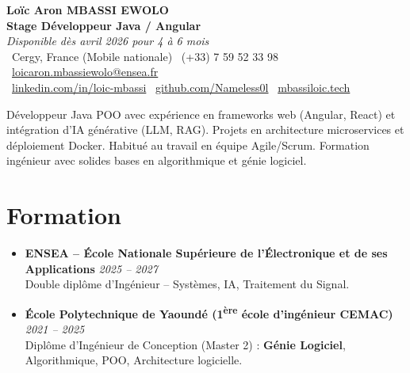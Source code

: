 \documentclass[a4paper,11pt]{article}
\begin{document}
\begin{center}
    {\Large \textbf{Loïc Aron MBASSI EWOLO}} \\ \vspace{4pt}
    \textbf{\large Stage Développeur Java / Angular} \\
    \textit{\small Disponible dès avril 2026 pour 4 à 6 mois} \\ \vspace{4pt}
    \small
    \faMapMarker\ Cergy, France (Mobile nationale) \quad
    \faPhone\ (+33) 7 59 52 33 98 \quad
    {\color{primary}\faEnvelope\ \href{mailto:loicaron.mbassiewolo@ensea.fr}{loicaron.mbassiewolo@ensea.fr}} \\ \vspace{2pt}
    {\color{primary}\faLinkedin\ \href{https://www.linkedin.com/in/loic-mbassi/}{linkedin.com/in/loic-mbassi}} \quad
    {\color{primary}\faGithub\ \href{https://github.com/Nameless0l}{github.com/Nameless0l}} \quad
    {\color{primary}\faGlobe\ \href{https://mbassiloic.tech}{mbassiloic.tech}}
\end{center}

\vspace{-6pt}

\noindent\small{Développeur Java POO avec expérience en frameworks web (Angular, React) et intégration d'IA générative (LLM, RAG). Projets en architecture microservices et déploiement Docker. Habitué au travail en équipe Agile/Scrum. Formation ingénieur avec solides bases en algorithmique et génie logiciel.}

\section{Formation}
\begin{itemize}[leftmargin=*, label=\tiny$\bullet$, nosep]
    \item \textbf{ENSEA -- École Nationale Supérieure de l'Électronique et de ses Applications} \hfill \textit{2025 -- 2027} \\
    \small{Double diplôme d'Ingénieur -- Systèmes, IA, Traitement du Signal.}
    \item \textbf{École Polytechnique de Yaoundé (1\textsuperscript{ère} école d'ingénieur CEMAC)} \hfill \textit{2021 -- 2025} \\
    \small{Diplôme d'Ingénieur de Conception (Master 2) : \textbf{Génie Logiciel}, Algorithmique, POO, Architecture logicielle.}
\end{itemize}
\end{document}
